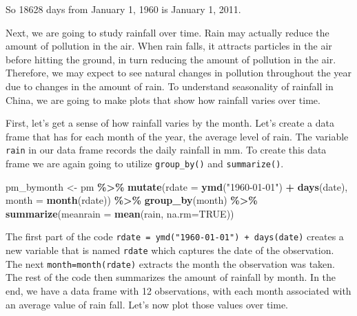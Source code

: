 \documentclass[
]{book}
\newenvironment{Shaded}{\begin{snugshade}}{\end{snugshade}}
\newcommand{\AttributeTok}[1]{\textcolor[rgb]{0.13,0.29,0.53}{#1}}
\newcommand{\ConstantTok}[1]{\textcolor[rgb]{0.56,0.35,0.01}{#1}}
\newcommand{\DecValTok}[1]{\textcolor[rgb]{0.00,0.00,0.81}{#1}}
\newcommand{\FunctionTok}[1]{\textcolor[rgb]{0.13,0.29,0.53}{\textbf{#1}}}
\newcommand{\NormalTok}[1]{#1}
\newcommand{\OtherTok}[1]{\textcolor[rgb]{0.56,0.35,0.01}{#1}}
\newcommand{\SpecialCharTok}[1]{\textcolor[rgb]{0.81,0.36,0.00}{\textbf{#1}}}
\newcommand{\StringTok}[1]{\textcolor[rgb]{0.31,0.60,0.02}{#1}}
\begin{document}
So 18628 days from January 1, 1960 is January 1, 2011.

Next, we are going to study rainfall over time. Rain may actually reduce the amount of pollution in the air. When rain falls, it attracts particles in the air before hitting the ground, in turn reducing the amount of pollution in the air. Therefore, we may expect to see natural changes in pollution throughout the year due to changes in the amount of rain. To understand seasonality of rainfall in China, we are going to make plots that show how rainfall varies over time.

First, let's get a sense of how rainfall varies by the month. Let's create a data frame that has for each month of the year, the average level of rain. The variable \texttt{rain} in our data frame records the daily rainfall in mm. To create this data frame we are again going to utilize \texttt{group\_by()} and \texttt{summarize()}.

\begin{Shaded}
\begin{Highlighting}[]
\NormalTok{pm\_bymonth }\OtherTok{\textless{}{-}}\NormalTok{ pm }\SpecialCharTok{\%\textgreater{}\%}
  \FunctionTok{mutate}\NormalTok{(}\AttributeTok{rdate =} \FunctionTok{ymd}\NormalTok{(}\StringTok{"1960{-}01{-}01"}\NormalTok{) }\SpecialCharTok{+} \FunctionTok{days}\NormalTok{(date),}
    \AttributeTok{month =} \FunctionTok{month}\NormalTok{(rdate)) }\SpecialCharTok{\%\textgreater{}\%}
    \FunctionTok{group\_by}\NormalTok{(month) }\SpecialCharTok{\%\textgreater{}\%}
    \FunctionTok{summarize}\NormalTok{(}\AttributeTok{meanrain =} \FunctionTok{mean}\NormalTok{(rain, }\AttributeTok{na.rm=}\ConstantTok{TRUE}\NormalTok{))}
\end{Highlighting}
\end{Shaded}

The first part of the code \texttt{rdate\ =\ ymd("1960-01-01")\ +\ days(date)} creates a new variable that is named \texttt{rdate} which captures the date of the observation. The next \texttt{month=month(rdate)} extracts the month the observation was taken. The rest of the code then summarizes the amount of rainfall by month. In the end, we have a data frame with 12 observations, with each month associated with an average value of rain fall. Let's now plot those values over time.

\begin{Shaded}
\end{Shaded}
\end{document}
